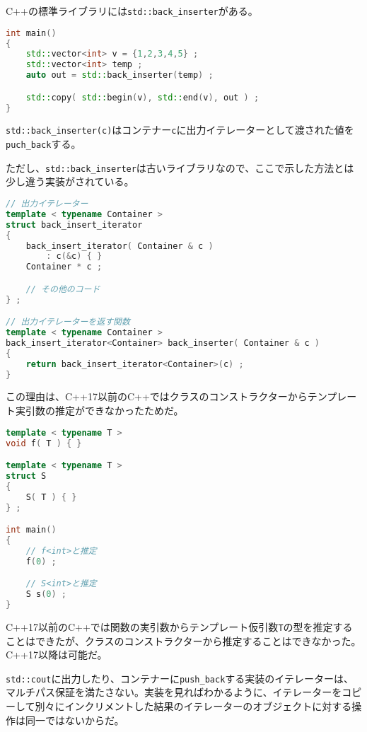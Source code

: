 C++の標準ライブラリには\texttt{std::back\_inserter}がある。

\begin{lstlisting}[language={C++}]
int main()
{
    std::vector<int> v = {1,2,3,4,5} ;
    std::vector<int> temp ;
    auto out = std::back_inserter(temp) ;

    std::copy( std::begin(v), std::end(v), out ) ;
}
\end{lstlisting}

\texttt{std::back\_inserter(c)}はコンテナー\texttt{c}に出力イテレーターとして渡された値を\texttt{puch\_back}する。

ただし、\texttt{std::back\_inserter}は古いライブラリなので、ここで示した方法とは少し違う実装がされている。

\begin{lstlisting}[language={C++}]
// 出力イテレーター
template < typename Container >
struct back_insert_iterator
{
    back_insert_iterator( Container & c )
        : c(&c) { }
    Container * c ;

    // その他のコード
} ;

// 出力イテレーターを返す関数
template < typename Container >
back_insert_iterator<Container> back_inserter( Container & c )
{
    return back_insert_iterator<Container>(c) ;
}
\end{lstlisting}

この理由は、C++17以前のC++ではクラスのコンストラクターからテンプレート実引数の推定ができなかったためだ。

\begin{lstlisting}[language={C++}]
template < typename T >
void f( T ) { }

template < typename T >
struct S
{
    S( T ) { }
} ;

int main()
{
    // f<int>と推定
    f(0) ;

    // S<int>と推定
    S s(0) ;
}
\end{lstlisting}

C++17以前のC++では関数の実引数からテンプレート仮引数\texttt{T}の型を推定することはできたが、クラスのコンストラクターから推定することはできなかった。C++17以降は可能だ。

\texttt{std::cout}に出力したり、コンテナーに\texttt{push\_back}する実装のイテレーターは、マルチパス保証を満たさない。実装を見ればわかるように、イテレーターをコピーして別々にインクリメントした結果のイテレーターのオブジェクトに対する操作は同一ではないからだ。


